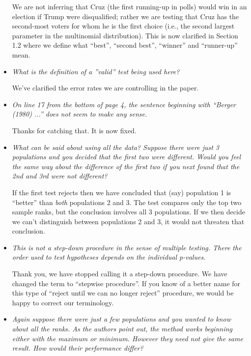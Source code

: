 \documentclass[]{article}
\theoremstyle{remark}
\begin{document}
\begin{itemize}
We are not inferring that Cruz (the first running-up in polls) would win in an election if Trump were disqualified; rather we are testing that Cruz has the second-most voters for whom he is the first choice (i.e., the second largest parameter in the multinomial distribution). This is now clarified in Section 1.2 where we define what ``best'', ``second best'', ``winner'' and ``runner-up'' mean.

\item {\em What is the definition of a ”valid” test being used here?}

We've clarified the error rates we are controlling in the paper.

\item {\em On line 17 from the bottom of page 4, the sentence beginning with ``Berger (1980) ...'' does not seem to make any sense.}

Thanks for catching that. It is now fixed.

\item {\em What can be said about using all the data? Suppose there were just 3 populations and you decided that the first two were different. Would you feel the same way about the difference of the first two if you next found that the 2nd and 3rd were not different?}

If the first test rejects then we have concluded that (say) population 1 is ``better'' than {\em both} populations 2 and 3. The test compares only the top two sample ranks, but the conclusion involves all 3 populations. If we then decide we can't distinguish between populations 2 and 3, it would not threaten that conclusion.

\item {\em This is not a step-down procedure in the sense of multiple testing. There the order used to test hypotheses depends on the individual p-values.}

Thank you, we have stopped calling it a step-down procedure. We have changed the term to ``stepwise procedure''. If you know of a better name for this type of ``reject until we can no longer reject'' procedure, we would be happy to correct our terminology.

\item {\em Again suppose there were just a few populations and you wanted to know about all the ranks. As the authors point out, the method works beginning either with the maximum or minimum. However they need not give the same result. How would their performance differ?}


\end{itemize}
\end{document}
